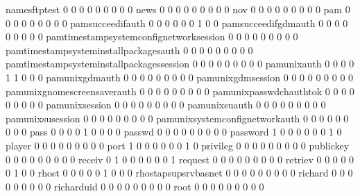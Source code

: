 \documentclass[compress,8pt]{beamer}
\begin{document}
\begin{frame}
\begin{Schunk}
  namesftptest                               0   0   0   0   0   0   0   0   0
  news                                       0   0   0   0   0   0   0   0   0
  nov                                        0   0   0   0   0   0   0   0   0
  pam                                        0   0   0   0   0   0   0   0   0
  pamsucceedifauth                           0   0   0   0   0   0   1   0   0
  pamsucceedifgdmauth                        0   0   0   0   0   0   0   0   0
  pamtimestampsystemconfignetworksession     0   0   0   0   0   0   0   0   0
  pamtimestampsysteminstallpackagesauth      0   0   0   0   0   0   0   0   0
  pamtimestampsysteminstallpackagessession   0   0   0   0   0   0   0   0   0
  pamunixauth                                0   0   0   0   1   1   0   0   0
  pamunixgdmauth                             0   0   0   0   0   0   0   0   0
  pamunixgdmsession                          0   0   0   0   0   0   0   0   0
  pamunixgnomescreensaverauth                0   0   0   0   0   0   0   0   0
  pamunixpasswdchauthtok                     0   0   0   0   0   0   0   0   0
  pamunixsession                             0   0   0   0   0   0   0   0   0
  pamunixsuauth                              0   0   0   0   0   0   0   0   0
  pamunixsusession                           0   0   0   0   0   0   0   0   0
  pamunixsystemconfignetworkauth             0   0   0   0   0   0   0   0   0
  pass                                       0   0   0   0   1   0   0   0   0
  passwd                                     0   0   0   0   0   0   0   0   0
  password                                   1   0   0   0   0   0   0   1   0
  player                                     0   0   0   0   0   0   0   0   0
  port                                       1   0   0   0   0   0   0   1   0
  privileg                                   0   0   0   0   0   0   0   0   0
  publickey                                  0   0   0   0   0   0   0   0   0
  receiv                                     0   1   0   0   0   0   0   0   1
  request                                    0   0   0   0   0   0   0   0   0
  retriev                                    0   0   0   0   0   0   1   0   0
  rhost                                      0   0   0   0   0   1   0   0   0
  rhostapsupsrvbasnet                        0   0   0   0   0   0   0   0   0
  richard                                    0   0   0   0   0   0   0   0   0
  richarduid                                 0   0   0   0   0   0   0   0   0
  root                                       0   0   0   0   0   0   0   0   0

\end{Schunk}
\end{frame}
\end{document}
